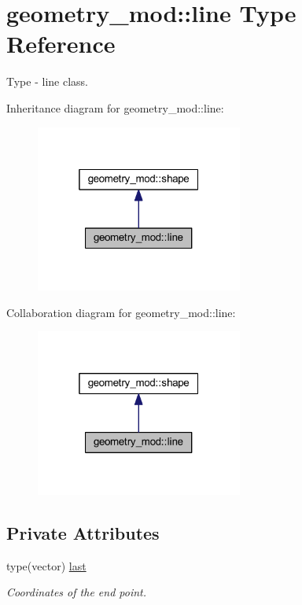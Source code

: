 \hypertarget{structgeometry__mod_1_1line}{}\section{geometry\+\_\+mod\+:\+:line Type Reference}
\label{structgeometry__mod_1_1line}


Type -\/ line class.  




Inheritance diagram for geometry\+\_\+mod\+:\+:line\+:
\nopagebreak
\begin{figure}[H]
\begin{center}
\leavevmode
\includegraphics[width=193pt]{structgeometry__mod_1_1line__inherit__graph}
\end{center}
\end{figure}


Collaboration diagram for geometry\+\_\+mod\+:\+:line\+:
\nopagebreak
\begin{figure}[H]
\begin{center}
\leavevmode
\includegraphics[width=193pt]{structgeometry__mod_1_1line__coll__graph}
\end{center}
\end{figure}
\subsection*{Private Attributes}
\begin{DoxyCompactItemize}
\item 
type(vector) \hyperlink{structgeometry__mod_1_1line_a1f7c879c60698c2f903f5258ad6f446c}{last}
\begin{DoxyCompactList}\small\item\em Coordinates of the end point. \end{DoxyCompactList}\end{DoxyCompactItemize}


